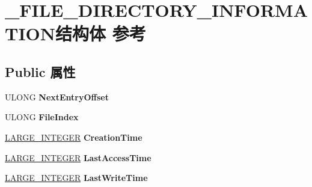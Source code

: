\hypertarget{struct___f_i_l_e___d_i_r_e_c_t_o_r_y___i_n_f_o_r_m_a_t_i_o_n}{}\section{\+\_\+\+F\+I\+L\+E\+\_\+\+D\+I\+R\+E\+C\+T\+O\+R\+Y\+\_\+\+I\+N\+F\+O\+R\+M\+A\+T\+I\+O\+N结构体 参考}
\label{struct___f_i_l_e___d_i_r_e_c_t_o_r_y___i_n_f_o_r_m_a_t_i_o_n}
\subsection*{Public 属性}
\begin{DoxyCompactItemize}
\item 
\mbox{\label{struct___f_i_l_e___d_i_r_e_c_t_o_r_y___i_n_f_o_r_m_a_t_i_o_n_aa81d035b73e123602fc8a84e8319c4b3}} 
U\+L\+O\+NG {\bfseries Next\+Entry\+Offset}
\item 
\mbox{\label{struct___f_i_l_e___d_i_r_e_c_t_o_r_y___i_n_f_o_r_m_a_t_i_o_n_aa937ee9c0a509cd8c867fa682608ede1}} 
U\+L\+O\+NG {\bfseries File\+Index}
\item 
\mbox{\label{struct___f_i_l_e___d_i_r_e_c_t_o_r_y___i_n_f_o_r_m_a_t_i_o_n_a580f6f421de96ad692f0bba18a64b83d}} 
\hyperlink{union___l_a_r_g_e___i_n_t_e_g_e_r}{L\+A\+R\+G\+E\+\_\+\+I\+N\+T\+E\+G\+ER} {\bfseries Creation\+Time}
\item 
\mbox{\label{struct___f_i_l_e___d_i_r_e_c_t_o_r_y___i_n_f_o_r_m_a_t_i_o_n_ac9dc0c4b8baa8ba6127731f758d826f1}} 
\hyperlink{union___l_a_r_g_e___i_n_t_e_g_e_r}{L\+A\+R\+G\+E\+\_\+\+I\+N\+T\+E\+G\+ER} {\bfseries Last\+Access\+Time}
\item 
\mbox{\label{struct___f_i_l_e___d_i_r_e_c_t_o_r_y___i_n_f_o_r_m_a_t_i_o_n_a7cbf629f2e75b1027da7609a75ceb833}} 
\hyperlink{union___l_a_r_g_e___i_n_t_e_g_e_r}{L\+A\+R\+G\+E\+\_\+\+I\+N\+T\+E\+G\+ER} {\bfseries Last\+Write\+Time}

\end{DoxyCompactItemize}
